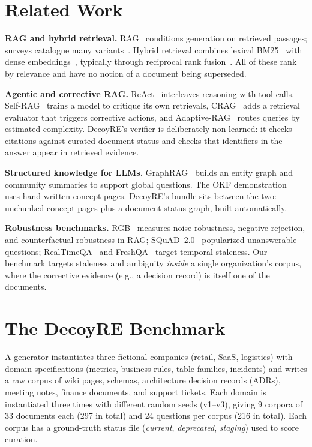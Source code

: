 \documentclass[conference]{IEEEtran}
\begin{document}
\section{Related Work}

\textbf{RAG and hybrid retrieval.} RAG~\cite{lewis2020rag} conditions generation on retrieved passages; surveys
catalogue many variants~\cite{gao2023survey}. Hybrid retrieval combines lexical BM25~\cite{robertson2009bm25}
with dense embeddings~\cite{nussbaum2024nomic}, typically through reciprocal rank fusion~\cite{cormack2009rrf}. All of
these rank by relevance and have no notion of a document being superseded.

\textbf{Agentic and corrective RAG.} ReAct~\cite{yao2023react} interleaves reasoning with tool calls.
Self-RAG~\cite{asai2024selfrag} trains a model to critique its own retrievals, CRAG~\cite{yan2024crag} adds a
retrieval evaluator that triggers corrective actions, and Adaptive-RAG~\cite{jeong2024adaptive} routes queries
by estimated complexity. DecoyRE's verifier is deliberately non-learned: it checks citations against curated
document status and checks that identifiers in the answer appear in retrieved evidence.

\textbf{Structured knowledge for LLMs.} GraphRAG~\cite{edge2024graphrag} builds an entity graph and community
summaries to support global questions. The OKF demonstration~\cite{ruiz2026okf} uses hand-written concept pages.
DecoyRE's bundle sits between the two: unchunked concept pages plus a document-status graph, built automatically.

\textbf{Robustness benchmarks.} RGB~\cite{chen2024rgb} measures noise robustness, negative rejection, and
counterfactual robustness in RAG; SQuAD~2.0~\cite{rajpurkar2018squad2} popularized unanswerable questions;
RealTimeQA~\cite{kasai2023realtimeqa} and FreshQA~\cite{vu2024freshllms} target temporal staleness. Our benchmark
targets staleness and ambiguity \emph{inside} a single organization's corpus, where the corrective evidence
(e.g., a decision record) is itself one of the documents.

\section{The DecoyRE Benchmark}

A generator instantiates three fictional companies (retail, SaaS, logistics) with domain specifications
(metrics, business rules, table families, incidents) and writes a raw corpus of wiki pages, schemas,
architecture decision records (ADRs), meeting notes, finance documents, and support tickets. Each domain is
instantiated three times with different random seeds (v1--v3), giving 9 corpora of 33 documents each (297 in
total) and 24 questions per corpus (216 in total). Each corpus has a ground-truth status file
(\emph{current}, \emph{deprecated}, \emph{staging}) used to score curation.
\end{document}
